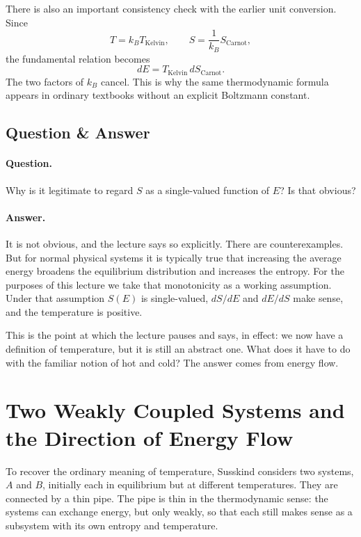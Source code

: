 There is also an important consistency check with the earlier unit conversion. Since
\begin{equation}
T = k_B T_{\mathrm{Kelvin}}, \qquad S = \frac{1}{k_B} S_{\mathrm{Carnot}},
\end{equation}
the fundamental relation becomes
\begin{equation}
dE = T_{\mathrm{Kelvin}}\, dS_{\mathrm{Carnot}}.
\end{equation}
The two factors of \(k_B\) cancel. This is why the same thermodynamic formula appears in ordinary textbooks without an explicit Boltzmann constant.

\subsection{Question \& Answer}

\paragraph{Question.} Why is it legitimate to regard \(S\) as a single-valued function of \(E\)? Is that obvious?

\paragraph{Answer.} It is not obvious, and the lecture says so explicitly. There are counterexamples. But for normal physical systems it is typically true that increasing the average energy broadens the equilibrium distribution and increases the entropy. For the purposes of this lecture we take that monotonicity as a working assumption. Under that assumption \(S(E)\) is single-valued, \(dS/dE\) and \(dE/dS\) make sense, and the temperature is positive.

This is the point at which the lecture pauses and says, in effect: we now have a definition of temperature, but it is still an abstract one. What does it have to do with the familiar notion of hot and cold? The answer comes from energy flow.

\section{Two Weakly Coupled Systems and the Direction of Energy Flow}

To recover the ordinary meaning of temperature, Susskind considers two systems, \(A\) and \(B\), initially each in equilibrium but at different temperatures. They are connected by a thin pipe. The pipe is thin in the thermodynamic sense: the systems can exchange energy, but only weakly, so that each still makes sense as a subsystem with its own entropy and temperature.

